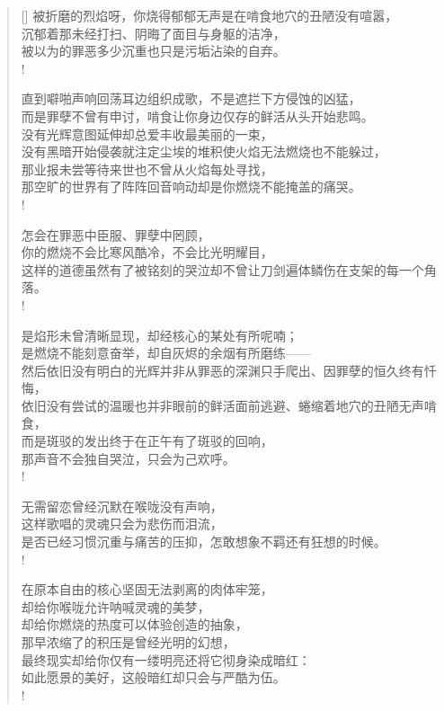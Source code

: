 \documentclass[UTF8, 12pt, a4paper]{ctexrep} %
\begin{document}
\begin{verse}[\versewidth]
被折磨的烈焰呀，你烧得郁郁无声是在啃食地穴的丑陋没有喧嚣，\\
沉郁着那未经打扫、阴晦了面目与身躯的洁净，\\
被以为的罪恶多少沉重也只是污垢沾染的自弃。\\!

直到噼啪声响回荡耳边组织成歌，不是遮拦下方侵蚀的凶猛，\\
而是罪孽不曾有申讨，啃食让你身边仅存的鲜活从头开始悲鸣。\\
没有光辉意图延伸却总爱丰收最美丽的一束，\\
没有黑暗开始侵袭就注定尘埃的堆积使火焰无法燃烧也不能躲过，\\
那业报未尝等待来世也不曾从火焰每处寻找，\\
那空旷的世界有了阵阵回音响动却是你燃烧不能掩盖的痛哭。\\!

怎会在罪恶中臣服、罪孽中罔顾，\\
你的燃烧不会比寒风酷冷，不会比光明耀目，\\
这样的道德虽然有了被铭刻的哭泣却不曾让刀剑遍体鳞伤在支架的每一个角落。\\!

是焰形未曾清晰显现，却经核心的某处有所呢喃；\\
是燃烧不能刻意奋举，却自灰烬的余烟有所磨练——\\
然后依旧没有明白的光辉并非从罪恶的深渊只手爬出、因罪孽的恒久终有忏悔，\\
依旧没有尝试的温暖也并非眼前的鲜活面前逃避、蜷缩着地穴的丑陋无声啃食，\\
而是斑驳的发出终于在正午有了斑驳的回响，\\
那声音不会独自哭泣，只会为己欢呼。\\!

无需留恋曾经沉默在喉咙没有声响，\\
这样歌唱的灵魂只会为悲伤而泪流，\\
是否已经习惯沉重与痛苦的压抑，怎敢想象不羁还有狂想的时候。\\!

在原本自由的核心坚固无法剥离的肉体牢笼，\\
却给你喉咙允许呐喊灵魂的美梦，\\
却给你燃烧的热度可以体验创造的抽象，\\
那早浓缩了的积压是曾经光明的幻想，\\
最终现实却给你仅有一缕明亮还将它彻身染成暗红：\\
如此愿景的美好，这般暗红却只会与严酷为伍。\\!


\end{verse}
\end{document}
